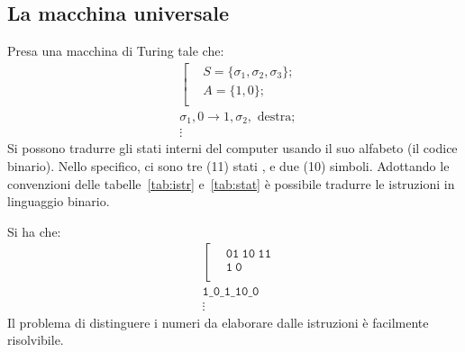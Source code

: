 		\subsection{La macchina universale}
Presa una macchina di Turing tale che:
\[
	\begin{aligned}	
	&\left[
		\begin{aligned}
&S=\{\sigma_1, \sigma_2, \sigma_3\}; \\
&A=\{1, 0\};	\\
		\end{aligned}
	\right .	\\
&\sigma_1, 0 \rightarrow 1, \sigma_2, \text{ destra};	\\
&\vdots
	\end{aligned}
\]
Si possono tradurre gli stati interni del computer usando il suo alfabeto (il codice binario). Nello specifico, ci sono tre (11) stati , e due (10) simboli. Adottando le convenzioni delle tabelle~\vref{tab:istr} e~\vref{tab:stat} è possibile tradurre le istruzioni in linguaggio binario.
\begin{table}
	\centering
{}\quad
\subfloat[][{\em Rappresentazione binaria degli stati interni.}\label{tab:stat}]{%
	\begin{tabular}{l c}
		\toprule
\emph{Stato}			&\emph{Numero}	\\
		\midrule
$\sigma_1$				&\lstinline!01!	\\
$\sigma_2$				&\lstinline!10!	\\
$\sigma_3$				&\lstinline!11!	\\
		\bottomrule
	\end{tabular}
}
	\caption[Macchina di Turing]{Convenzioni binarie per la macchina di Turing}
\end{table}
Si ha che:
\[
	\begin{aligned}	
	&\left[
		\begin{aligned}
&\mathtt{01\ 10\ 11} 		\\
&\mathtt{1\ 0} 			\\
		\end{aligned}
	\right .	\\
&\mathtt{1\_0\_1\_10\_0}	\\
&\vdots
	\end{aligned}
\]
Il problema di distinguere i numeri da elaborare dalle istruzioni è facilmente risolvibile.

